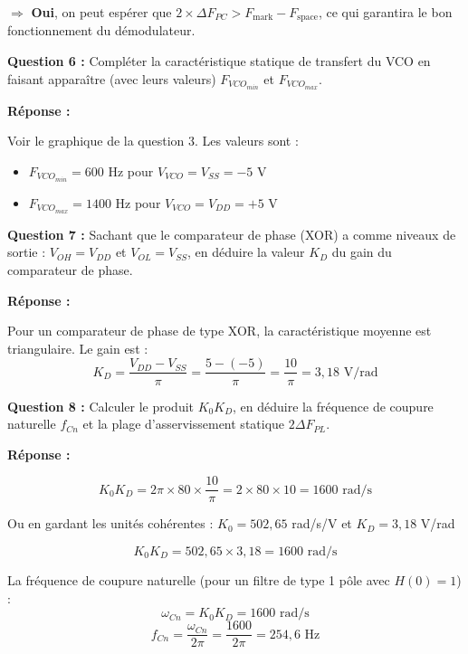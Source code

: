 \documentclass[a4paper,11pt]{article}
\begin{document}
$\Rightarrow$ \textbf{Oui}, on peut espérer que $2 \times \Delta F_{PC} > F_{\text{mark}} - F_{\text{space}}$, ce qui garantira le bon fonctionnement du démodulateur.

\vspace{0.5cm}
\textbf{Question 6 :} Compléter la caractéristique statique de transfert du VCO en faisant apparaître (avec leurs valeurs) $F_{VCO_{min}}$ et $F_{VCO_{max}}$.

\vspace{0.3cm}
\textbf{Réponse :}

Voir le graphique de la question 3. Les valeurs sont :
\begin{itemize}
    \item $F_{VCO_{min}} = 600$ Hz pour $V_{VCO} = V_{SS} = -5$ V
    \item $F_{VCO_{max}} = 1400$ Hz pour $V_{VCO} = V_{DD} = +5$ V
\end{itemize}

\vspace{0.5cm}
\textbf{Question 7 :} Sachant que le comparateur de phase (XOR) a comme niveaux de sortie : $V_{OH} = V_{DD}$ et $V_{OL} = V_{SS}$, en déduire la valeur $K_D$ du gain du comparateur de phase.

\vspace{0.3cm}
\textbf{Réponse :}

Pour un comparateur de phase de type XOR, la caractéristique moyenne est triangulaire. Le gain est :
\[
K_D = \frac{V_{DD} - V_{SS}}{\pi} = \frac{5 - (-5)}{\pi} = \frac{10}{\pi} = \boxed{3{,}18 \text{ V/rad}}
\]

\vspace{0.5cm}
\textbf{Question 8 :} Calculer le produit $K_0 K_D$, en déduire la fréquence de coupure naturelle $f_{Cn}$ et la plage d'asservissement statique $2\Delta F_{PL}$.

\vspace{0.3cm}
\textbf{Réponse :}

\[
K_0 K_D = 2\pi \times 80 \times \frac{10}{\pi} = 2 \times 80 \times 10 = \boxed{1600 \text{ rad/s}}
\]

Ou en gardant les unités cohérentes : $K_0 = 502{,}65$ rad/s/V et $K_D = 3{,}18$ V/rad

\[
K_0 K_D = 502{,}65 \times 3{,}18 = 1600 \text{ rad/s}
\]

La fréquence de coupure naturelle (pour un filtre de type 1 pôle avec $H(0) = 1$) :
\[
\omega_{Cn} = K_0 K_D = 1600 \text{ rad/s}
\]
\[
f_{Cn} = \frac{\omega_{Cn}}{2\pi} = \frac{1600}{2\pi} = \boxed{254{,}6 \text{ Hz}}
\]
\end{document}
